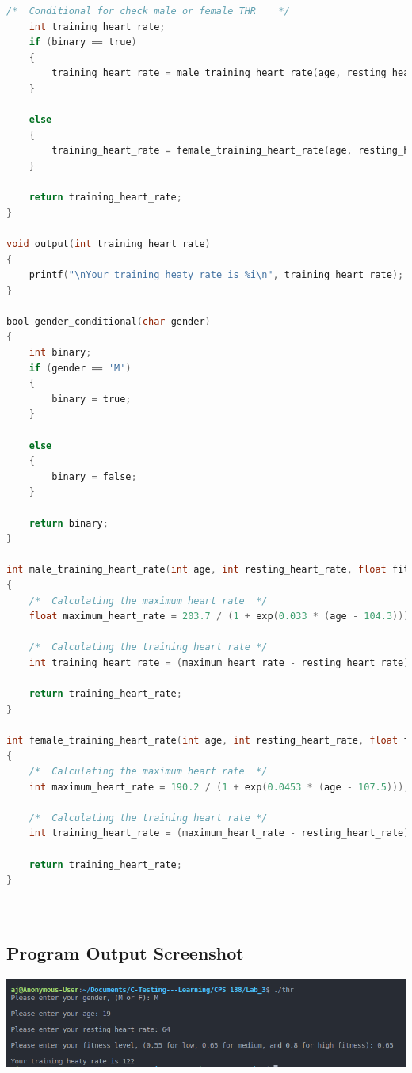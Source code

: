 \begin{lstlisting}[language=C, caption=\textit{Hello World Program}]
    /*  Conditional for check male or female THR    */
    int training_heart_rate;
    if (binary == true)
    {
        training_heart_rate = male_training_heart_rate(age, resting_heart_rate, fitness_level);
    }

    else
    {
        training_heart_rate = female_training_heart_rate(age, resting_heart_rate, fitness_level);
    }

    return training_heart_rate;
}

void output(int training_heart_rate)
{
    printf("\nYour training heaty rate is %i\n", training_heart_rate);
}

bool gender_conditional(char gender)
{
    int binary;
    if (gender == 'M')
    {
        binary = true;
    }

    else
    {
        binary = false;
    }
    
    return binary;
}

int male_training_heart_rate(int age, int resting_heart_rate, float fitness_level)
{
    /*  Calculating the maximum heart rate  */
    float maximum_heart_rate = 203.7 / (1 + exp(0.033 * (age - 104.3)));

    /*  Calculating the training heart rate */
    int training_heart_rate = (maximum_heart_rate - resting_heart_rate) * fitness_level + resting_heart_rate;

    return training_heart_rate;
}

int female_training_heart_rate(int age, int resting_heart_rate, float fitness_level)
{
    /*  Calculating the maximum heart rate  */
    int maximum_heart_rate = 190.2 / (1 + exp(0.0453 * (age - 107.5)));

    /*  Calculating the training heart rate */
    int training_heart_rate = (maximum_heart_rate - resting_heart_rate) * fitness_level + resting_heart_rate;

    return training_heart_rate;
}




\end{lstlisting}

	\subsection{{Program Output Screenshot}}

		\includegraphics[width=15cm]{thr.png}
		
